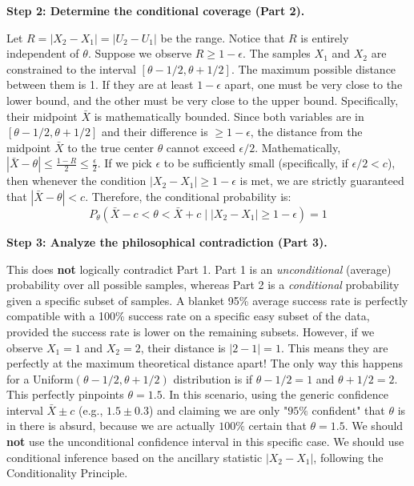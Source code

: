 \begin{solution}
\textbf{Step 2: Determine the conditional coverage (Part 2).}

Let $R = |X_2 - X_1| = |U_2 - U_1|$ be the range. Notice that $R$ is entirely independent of $\theta$.
Suppose we observe $R \geq 1 - \epsilon$.
The samples $X_1$ and $X_2$ are constrained to the interval $[\theta-1/2, \theta+1/2]$. The maximum possible distance between them is 1.
If they are at least $1-\epsilon$ apart, one must be very close to the lower bound, and the other must be very close to the upper bound.
Specifically, their midpoint $\bar{X}$ is mathematically bounded. Since both variables are in $[\theta-1/2, \theta+1/2]$ and their difference is $\geq 1-\epsilon$, the distance from the midpoint $\bar{X}$ to the true center $\theta$ cannot exceed $\epsilon/2$.
Mathematically, $|\bar{X} - \theta| \leq \frac{1 - R}{2} \leq \frac{\epsilon}{2}$.
If we pick $\epsilon$ to be sufficiently small (specifically, if $\epsilon/2 < c$), then whenever the condition $|X_2 - X_1| \geq 1 - \epsilon$ is met, we are strictly guaranteed that $|\bar{X} - \theta| < c$.
Therefore, the conditional probability is:
\[ P_\theta(\bar{X} - c < \theta < \bar{X} + c \mid |X_2 - X_1| \geq 1 - \epsilon) = 1 \]

\textbf{Step 3: Analyze the philosophical contradiction (Part 3).}

This does \textbf{not} logically contradict Part 1. Part 1 is an \textit{unconditional} (average) probability over all possible samples, whereas Part 2 is a \textit{conditional} probability given a specific subset of samples. A blanket 95\% average success rate is perfectly compatible with a 100\% success rate on a specific easy subset of the data, provided the success rate is lower on the remaining subsets.
However, if we observe $X_1 = 1$ and $X_2 = 2$, their distance is $|2 - 1| = 1$.
This means they are perfectly at the maximum theoretical distance apart! The only way this happens for a Uniform$(\theta-1/2, \theta+1/2)$ distribution is if $\theta-1/2 = 1$ and $\theta+1/2 = 2$. This perfectly pinpoints $\theta = 1.5$.
In this scenario, using the generic confidence interval $\bar{X} \pm c$ (e.g., $1.5 \pm 0.3$) and claiming we are only "$95\%$ confident" that $\theta$ is in there is absurd, because we are actually $100\%$ certain that $\theta = 1.5$.
We should \textbf{not} use the unconditional confidence interval in this specific case. We should use conditional inference based on the ancillary statistic $|X_2 - X_1|$, following the Conditionality Principle.
\end{solution}

